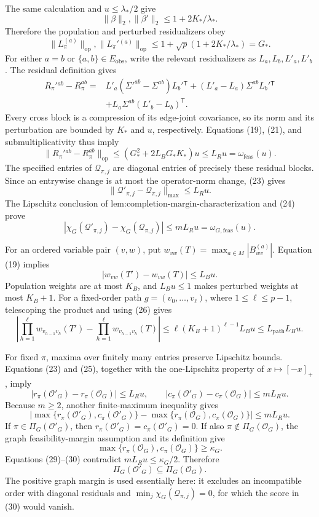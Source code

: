 The same calculation and \(u\le\lambda_*/2\) give
\[
\|\beta\|_2,\|\beta'\|_2\le1+2K_*/\lambda_*.
\tag{20}
\]
Therefore the population and perturbed residualizers obey
\[
\|L_\pi^{(a)}\|_{\mathrm{op}},\|L_\pi'{}^{(a)}\|_{\mathrm{op}}
\le1+\sqrt p(1+2K_*/\lambda_*)=G_*.
\tag{21}
\]
For either \(a=b\) or \(\{a,b\}\in E_{\mathrm{obs}}\), write the relevant residualizers as \(L_a,L_b,L'_a,L'_b\).  The residual definition gives
\[
\begin{aligned}
R_\pi'{}^{ab}-R_\pi^{ab}
={}&L'_a(\Sigma'^{ab}-\Sigma^{ab})L_b'{}^{\mathsf T}
+(L'_a-L_a)\Sigma^{ab}L_b'{}^{\mathsf T}\\
&+L_a\Sigma^{ab}(L'_b-L_b)^{\mathsf T}.
\end{aligned}
\tag{22}
\]
Every cross block is a compression of its edge-joint covariance, so its norm and its perturbation are bounded by \(K_*\) and \(u\), respectively.  Equations (19), (21), and submultiplicativity thus imply
\[
\|R_\pi'{}^{ab}-R_\pi^{ab}\|_{\mathrm{op}}
\le(G_*^2+2L_BG_*K_*)u
\le L_Ru=\omega_{\mathrm{feas}}(u).
\tag{23}
\]
The specified entries of \(\mathcal Q_{\pi,j}\) are diagonal entries of precisely these residual blocks.  Since an entrywise change is at most the operator-norm change, (23) gives
\[
\|\mathcal Q'_{\pi,j}-\mathcal Q_{\pi,j}\|_{\max}\le L_Ru.
\tag{24}
\]
The Lipschitz conclusion of \(\text{lem:completion-margin-characterization}\) and (24) prove
\[
|\chi_G(\mathcal Q'_{\pi,j})-\chi_G(\mathcal Q_{\pi,j})|
\le mL_Ru=\omega_{G,\mathrm{feas}}(u).
\tag{25}
\]

For an ordered variable pair \((v,w)\), put \(w_{vw}(T)=\max_{a\in M}|B_{wv}^{(a)}|\).  Equation (19) implies
\[
|w_{vw}(T')-w_{vw}(T)|\le L_Bu.
\tag{26}
\]
Population weights are at most \(K_B\), and \(L_Bu\le1\) makes perturbed weights at most \(K_B+1\).  For a fixed-order path \(g=(v_0,\ldots,v_\ell)\), where \(1\le\ell\le p-1\), telescoping the product and using (26) gives
\[
\left|\prod_{h=1}^{\ell}w_{v_{h-1}v_h}(T')-
\prod_{h=1}^{\ell}w_{v_{h-1}v_h}(T)\right|
\le\ell(K_B+1)^{\ell-1}L_Bu
\le L_{\mathrm{path}}L_Bu.
\tag{27}
\]

For fixed \(\pi\), maxima over finitely many entries preserve Lipschitz bounds.  Equations (23) and (25), together with the one-Lipschitz property of \(x\mapsto[-x]_+\), imply
\[
|r_\pi(\mathcal O'_G)-r_\pi(\mathcal O_G)|\le L_Ru,
\qquad
|c_\pi(\mathcal O'_G)-c_\pi(\mathcal O_G)|\le mL_Ru.
\tag{28}
\]
Because \(m\ge2\), another finite-maximum inequality gives
\[
\left|\max\{r_\pi(\mathcal O'_G),c_\pi(\mathcal O'_G)\}
-\max\{r_\pi(\mathcal O_G),c_\pi(\mathcal O_G)\}\right|
\le mL_Ru.
\tag{29}
\]
If \(\pi\in\Pi_G(\mathcal O'_G)\), then \(r_\pi(\mathcal O'_G)=c_\pi(\mathcal O'_G)=0\).  If also \(\pi\notin\Pi_G(\mathcal O_G)\), the graph feasibility-margin assumption and its definition give
\[
\max\{r_\pi(\mathcal O_G),c_\pi(\mathcal O_G)\}\ge\kappa_G.
\tag{30}
\]
Equations (29)--(30) contradict \(mL_Ru\le\kappa_G/2\).  Therefore
\[
\Pi_G(\mathcal O'_G)\subseteq\Pi_G(\mathcal O_G).
\tag{31}
\]
The positive graph margin is used essentially here: it excludes an incompatible order with diagonal residuals and \(\min_j\chi_G(\mathcal Q_{\pi,j})=0\), for which the score in (30) would vanish.

